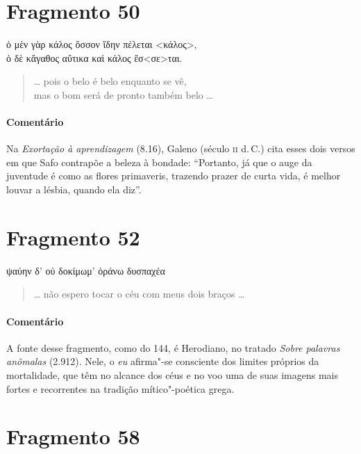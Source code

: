 \section{Fragmento 50}

\begin{gkverse}
ὀ μὲν γὰρ κάλος ὄσσον ἴδην πέλεται <κάλος>,\\
ὀ δὲ κἄγαθος αὔτικα καὶ κάλος ἔσ<σε>ται.
\end{gkverse}

\begin{verse}
\ldots{} pois o belo é belo enquanto se vê,\\
mas o bom será de pronto também belo \ldots{}
\end{verse}

\medskip

{\paragraph{Comentário} Na \emph{Exortação à aprendizagem} (8.16), Galeno (século \textsc{ii} d.\,C.) cita esses dois versos
em que Safo contrapõe a beleza à bondade: ``Portanto, já que o auge da
juventude é como as flores primaveris, trazendo prazer de curta vida, é melhor
louvar a lésbia, quando ela diz''.}

\section{Fragmento 52}

\begin{gkverse}
ψαύην δ’ οὐ δοκίμωμ’ ὀράνω \dagger{}δυσπαχέα\dagger{}
\end{gkverse}

\begin{verse}
\ldots{} não espero tocar o céu com meus dois braços \ldots{}
\end{verse}

\medskip

{\paragraph{Comentário} A fonte desse fragmento, como do 144, é Herodiano, no tratado \emph{Sobre
palavras anômalas} (2.912). Nele, o \emph{eu} afirma"-se consciente dos limites próprios da
mortalidade, que têm no alcance dos céus e no voo uma de suas imagens mais
fortes e recorrentes na tradição mítico"-poética grega.}

\section{Fragmento 58}


